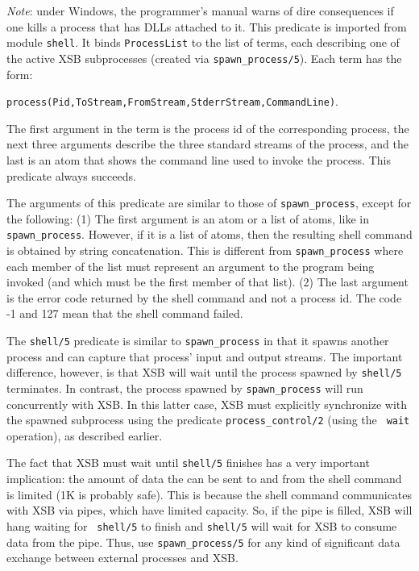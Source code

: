 \begin{description}
    \emph{Note}: under Windows, the programmer's manual warns of dire
    consequences if one kills a process that has DLLs attached to it.
%
    This predicate is imported from module {\tt shell}.
    It binds {\tt ProcessList} to the list of terms, each describing one of
    the active XSB subprocesses (created via \verb|spawn_process/5|).
    Each term has the form:
    \begin{center}
      \verb|process(Pid,ToStream,FromStream,StderrStream,CommandLine)|. 
    \end{center}
    The first argument in the term is the process id of the corresponding
    process, the next three arguments describe the three standard streams
    of the process, and the last is an atom that shows the command line used
    to invoke the process.
    This predicate always succeeds.

%
The arguments of this predicate are similar to those of
\verb|spawn_process|, except for the following: (1) The first argument
is an atom or a list of atoms, like in \verb|spawn_process|. However,
if it is a list of atoms, then the resulting shell command is obtained
by string concatenation. This is different from \verb|spawn_process|
where each member of the list must represent an argument to the
program being invoked (and which must be the first member of that
list).  (2) The last argument is the error code returned by the shell
command and not a process id. The code -1 and 127 mean that the shell
command failed.
    
    The {\tt shell/5} predicate is similar to \verb|spawn_process| in
    that it spawns another process and can capture that process' input
    and output streams.
%    
    The important difference, however, is that XSB will wait until the
    process spawned by {\tt shell/5} terminates. In contrast, the process
    spawned by \verb|spawn_process| will run concurrently with XSB.  In
    this latter case, XSB must explicitly synchronize with the spawned
    subprocess using the predicate \verb|process_control/2| (using the {\tt
      wait} operation), as described earlier.
    
    The fact that XSB must wait until {\tt shell/5} finishes has a very
    important implication: the amount of data the can be sent to and from
    the shell command is limited (1K is probably safe). This is because the
    shell command communicates with XSB via pipes, which have limited
    capacity.  So, if the pipe is filled, XSB will hang waiting for {\tt
      shell/5} to finish and {\tt shell/5} will wait for XSB to consume data
    from the pipe.  Thus, use \verb|spawn_process/5| for any kind of
    significant data exchange between external processes and XSB.
  

\end{description}
